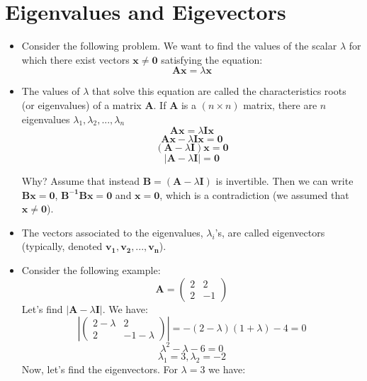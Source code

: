 \documentclass[11pt]{article}
\theoremstyle{definition}
\theoremstyle{remark}
\begin{document}
\section{Eigenvalues and Eigevectors}
\begin{itemize}
\item Consider the following problem. We want to find the values of the scalar $\lambda$ for which there exist vectors $\mathbf{x} \neq \mathbf{0}$ satisfying the equation:
$$
\mathbf{Ax} = \lambda\mathbf{x}
$$
\item The values of $\lambda$ that solve this equation are called the characteristics roots (or eigenvalues) of a matrix \textbf{A}. If \textbf{A} is a $(n \times n)$ matrix, there are $n$ eigenvalues $\lambda_1, \lambda_2, ..., \lambda_n$
$$
\mathbf{Ax} = \lambda\mathbf{Ix}
$$
$$
\mathbf{Ax} - \lambda\mathbf{Ix} = \mathbf{0}
$$
$$
(\mathbf{A} - \lambda\mathbf{I})\mathbf{x} = \mathbf{0}
$$
$$
|\mathbf{A} - \lambda\mathbf{I}| = \mathbf{0}
$$

Why? Assume that instead $\mathbf{B} = (\mathbf{A} - \lambda\mathbf{I})$ is invertible. Then we can write $\mathbf{Bx = 0}$, $\mathbf{B^{-1}Bx=0}$ and $\mathbf{x = 0}$, which is a contradiction (we assumed that $\mathbf{x} \neq \mathbf{0}$). 
\item The vectors associated to the eigenvalues, $\lambda_i$'s, are called eigenvectors (typically, denoted $\mathbf{v_1, v_2, ..., v_n}$).
\item Consider the following example:
$$
\mathbf{A} = 
\begin{pmatrix}
2&2 \\
2&-1
\end{pmatrix}
$$
Let's find $|\mathbf{A}-\lambda \mathbf{I}|$. We have:
$$
|\begin{pmatrix}
2-\lambda & 2 \\
2 & -1 - \lambda
\end{pmatrix}|
= -(2 - \lambda )(1+\lambda) - 4 = 0
$$
$$
\lambda^2 - \lambda - 6 = 0
$$
$$
\lambda_1 = 3, \lambda_2 = -2
$$
Now, let's find the eigenvectors. For $\lambda = 3$ we have:


\end{itemize}
\end{document}

